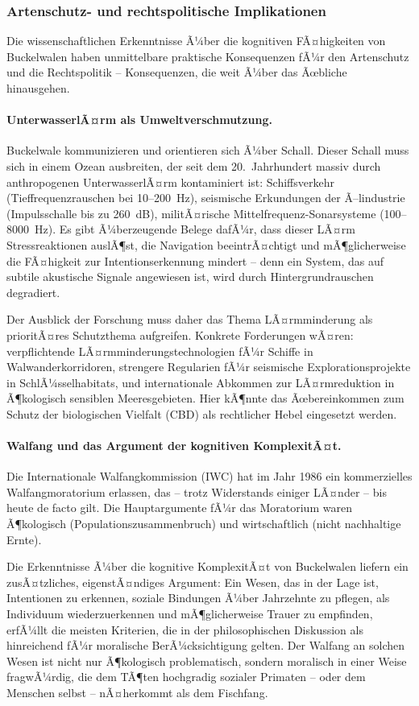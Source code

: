 ﻿\documentclass[12pt,a4paper]{article}
\theoremstyle{definition}
\theoremstyle{remark}
\begin{document}
\subsubsection{Artenschutz- und rechtspolitische Implikationen}

Die wissenschaftlichen Erkenntnisse Ã¼ber die kognitiven FÃ¤higkeiten von Buckelwalen haben unmittelbare praktische Konsequenzen fÃ¼r den Artenschutz und die Rechtspolitik -- Konsequenzen, die weit Ã¼ber das Ãœbliche hinausgehen.

\paragraph{UnterwasserlÃ¤rm als Umweltverschmutzung.}
Buckelwale kommunizieren und orientieren sich Ã¼ber Schall. Dieser Schall muss sich in einem Ozean ausbreiten, der seit dem 20.\ Jahrhundert massiv durch anthropogenen UnterwasserlÃ¤rm kontaminiert ist: Schiffsverkehr (Tieffrequenzrauschen bei 10--200~Hz), seismische Erkundungen der Ã–lindustrie (Impulsschalle bis zu 260~dB), militÃ¤rische Mittelfrequenz-Sonarsysteme (100--8000~Hz). Es gibt Ã¼berzeugende Belege dafÃ¼r, dass dieser LÃ¤rm Stressreaktionen auslÃ¶st, die Navigation beeintrÃ¤chtigt und mÃ¶glicherweise die FÃ¤higkeit zur Intentionserkennung mindert -- denn ein System, das auf subtile akustische Signale angewiesen ist, wird durch Hintergrundrauschen degradiert.

Der Ausblick der Forschung muss daher das Thema LÃ¤rmminderung als prioritÃ¤res Schutzthema aufgreifen. Konkrete Forderungen wÃ¤ren: verpflichtende LÃ¤rmminderungstechnologien fÃ¼r Schiffe in Walwanderkorridoren, strengere Regularien fÃ¼r seismische Explorationsprojekte in SchlÃ¼sselhabitats, und internationale Abkommen zur LÃ¤rmreduktion in Ã¶kologisch sensiblen Meeresgebieten. Hier kÃ¶nnte das Ãœbereinkommen zum Schutz der biologischen Vielfalt (CBD) als rechtlicher Hebel eingesetzt werden.

\paragraph{Walfang und das Argument der kognitiven KomplexitÃ¤t.}
Die Internationale Walfangkommission (IWC) hat im Jahr 1986 ein kommerzielles Walfangmoratorium erlassen, das -- trotz Widerstands einiger LÃ¤nder -- bis heute de facto gilt. Die Hauptargumente fÃ¼r das Moratorium waren Ã¶kologisch (Populationszusammenbruch) und wirtschaftlich (nicht nachhaltige Ernte).

Die Erkenntnisse Ã¼ber die kognitive KomplexitÃ¤t von Buckelwalen liefern ein zusÃ¤tzliches, eigenstÃ¤ndiges Argument: Ein Wesen, das in der Lage ist, Intentionen zu erkennen, soziale Bindungen Ã¼ber Jahrzehnte zu pflegen, als Individuum wiederzuerkennen und mÃ¶glicherweise Trauer zu empfinden, erfÃ¼llt die meisten Kriterien, die in der philosophischen Diskussion als hinreichend fÃ¼r moralische BerÃ¼cksichtigung gelten. Der Walfang an solchen Wesen ist nicht nur Ã¶kologisch problematisch, sondern moralisch in einer Weise fragwÃ¼rdig, die dem TÃ¶ten hochgradig sozialer Primaten -- oder dem Menschen selbst -- nÃ¤herkommt als dem Fischfang.
\end{document}
